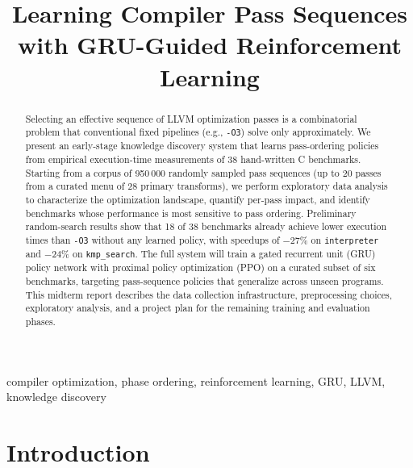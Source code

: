\documentclass[conference]{IEEEtran}
\begin{document}
\title{Learning Compiler Pass Sequences with GRU-Guided Reinforcement Learning}

\author{
}

\maketitle

\begin{abstract}
Selecting an effective sequence of LLVM optimization passes is a combinatorial
problem that conventional fixed pipelines (e.g., \texttt{-O3}) solve only
approximately.  We present an early-stage knowledge discovery system that
learns pass-ordering policies from empirical execution-time measurements of 38
hand-written C benchmarks.  Starting from a corpus of 950\,000 randomly sampled
pass sequences (up to 20 passes from a curated menu of 28 primary transforms),
we perform exploratory data analysis to characterize the optimization landscape,
quantify per-pass impact, and identify benchmarks whose performance is most
sensitive to pass ordering.  Preliminary random-search results show that 18 of
38 benchmarks already achieve lower execution times than \texttt{-O3} without
any learned policy, with speedups of $-27\%$ on \texttt{interpreter} and
$-24\%$ on \texttt{kmp\_search}.  The full system will train a gated recurrent
unit (GRU) policy network with proximal policy optimization (PPO) on a curated
subset of six benchmarks, targeting pass-sequence policies that generalize
across unseen programs.  This midterm report describes the data collection
infrastructure, preprocessing choices, exploratory analysis, and a project
plan for the remaining training and evaluation phases.
\end{abstract}

\begin{IEEEkeywords}
compiler optimization, phase ordering, reinforcement learning, GRU, LLVM,
knowledge discovery
\end{IEEEkeywords}

\section{Introduction}
\end{document}
